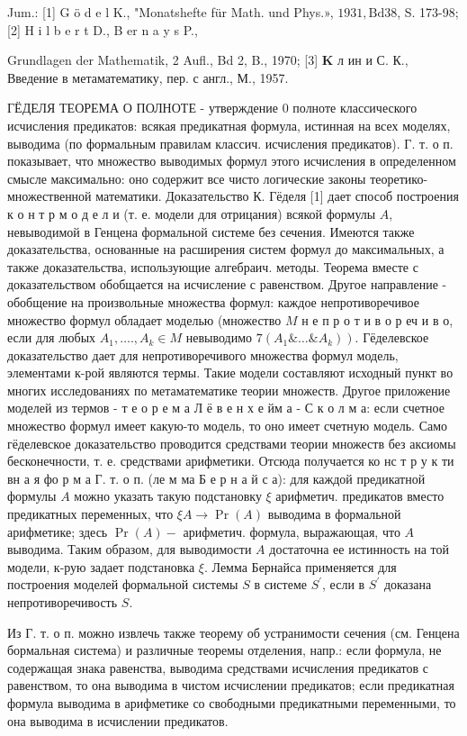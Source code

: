 \documentclass[10pt]{article}
\begin{document}
Jum.: [1] G ö d e l K., "Monatshefte für Math. und Phys.», $1931, \mathrm{Bd} 38$, S. 173-98; [2] H i l b e r t D., B er n a y s P.,

Grundlagen der Mathematik, 2 Aufl., Bd 2, B., 1970; [3] $\mathbf{K}$ л ин и С. К., Введение в метаматематику, пер. с англ., М., 1957.



ГЁДЕЛЯ ТЕОРЕМА О ПОЛНОТЕ - утверждение 0 полноте классического исчисления предикатов: всякая предикатная формула, истинная на всех моделях, выводима (по формальным правилам классич. исчисления предикатов). Г. т. о п. показывает, что множество выводимых формул этого исчисления в определенном смысле максимально: оно содержит все чисто логические законы теоретико-множественной математики. Доказательство К. Гёделя [1] дает способ построения к о н т р м о д е л и (т. е. модели для отрицания) всякой формулы $A$, невыводимой в Генцена формальной системе без сечения. Имеются также доказательства, основанные на расширения систем формул до максимальных, а также доказательства, использующие алгебраич. методы. Теорема вместе с доказательством обобщается на исчисление с равенством. Другое направление - обобщение на произвольные множества формул: каждое непротиворечивое множество формул обладает моделью (множество $M$ н е п р о т и в о р еч и в о, если для любых $A_{1}, \ldots ., A_{k} \in M$ невыводимо $\left.7\left(A_{1} \& \ldots \& A_{k}\right)\right)$. Гёделевское доказательство дает для непротиворечивого множества формул модель, элементами к-рой являются термы. Такие модели составляют исходный пункт во многих исследованиях по метаматематике теории множеств. Другое приложение моделей из термов - т е о р е м а Л ё в е н х е йм а - С к о л м а: если счетное множество формул имеет какую-то модель, то оно имеет счетную модель. Само гёделевское доказательство проводится средствами теории множеств без аксиомы бесконечности, т. е. средствами арифметики. Отсюда получается ко нс т р у к ти вн а я фо р м а Г. т. о п. (ле м ма Б е р н а й с а): для каждой предикатной формулы $A$ можно указать такую подстановку $\xi$ арифметич. предикатов вместо предикатных переменных, что $\xi A \rightarrow \operatorname{Pr}(A)$ выводима в формальной арифметике; здесь $\operatorname{Pr}(A)-$ арифметич. формула, выражающая, что $A$ выводима. Таким образом, для выводимости $A$ достаточна ее истинность на той модели, к-рую задает подстановка $\xi$. Лемма Бернайса применяется для построения моделей формальной системы $S$ в системе $S^{\prime}$, если в $S^{\prime}$ доказана непротиворечивость $S$.



Из Г. т. о п. можно извлечь также теорему об устранимости сечения (см. Генцена бормальная система) и различные теоремы отделения, напр.: если формула, не содержащая знака равенства, выводима средствами исчисления предикатов с равенством, то она выводима в чистом исчислении предикатов; если предикатная формула выводима в арифметике со свободными предикатными переменными, то она выводима в исчислении предикатов.
\end{document}
